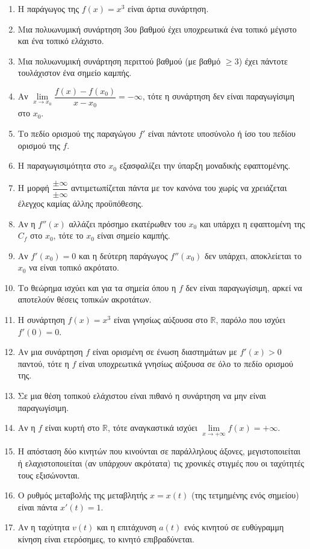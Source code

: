 \begin{enumerate}[label=\textbf{2.\arabic*.}]
    \item Η παράγωγος της $f(x) = x^3$ είναι άρτια συνάρτηση.
    \item Μια πολυωνυμική συνάρτηση 3ου βαθμού έχει υποχρεωτικά ένα τοπικό μέγιστο και ένα τοπικό ελάχιστο.
    \item Μια πολυωνυμική συνάρτηση περιττού βαθμού (με βαθμό $\ge 3$) έχει πάντοτε τουλάχιστον ένα σημείο καμπής.
    \item Αν $\lim\limits_{x \to x_0} \dfrac{f(x)-f(x_0)}{x-x_0} = -\infty$, τότε η συνάρτηση δεν είναι παραγωγίσιμη στο $x_0$.
    \item Το πεδίο ορισμού της παραγώγου $f'$ είναι πάντοτε υποσύνολο ή ίσο του πεδίου ορισμού της $f$.
    \item Η παραγωγισιμότητα στο $x_0$ εξασφαλίζει την ύπαρξη μοναδικής εφαπτομένης.
    \item Η μορφή $\dfrac{\pm\infty}{\pm\infty}$ αντιμετωπίζεται πάντα με τον κανόνα του  χωρίς να χρειάζεται έλεγχος καμίας άλλης προϋπόθεσης.
    \item Αν η $f''(x)$ αλλάζει πρόσημο εκατέρωθεν του $x_0$ και υπάρχει η εφαπτομένη της $C_f$ στο $x_0$, τότε το $x_0$ είναι σημείο καμπής.
    \item Αν $f'(x_0) = 0$ και η δεύτερη παράγωγος $f''(x_0)$ δεν υπάρχει, αποκλείεται το $x_0$ να είναι τοπικό ακρότατο.
    \item Το θεώρημα  ισχύει και για τα σημεία όπου η $f$ δεν είναι παραγωγίσιμη, αρκεί να αποτελούν θέσεις τοπικών ακροτάτων.
    \item Η συνάρτηση $f(x) = x^3$ είναι γνησίως αύξουσα στο $\mathbb{R}$, παρόλο που ισχύει $f'(0) = 0$.
    \item Αν μια συνάρτηση $f$ είναι ορισμένη σε ένωση διαστημάτων με $f'(x)>0$ παντού, τότε η $f$ είναι υποχρεωτικά γνησίως αύξουσα σε όλο το πεδίο ορισμού της.
    \item Σε μια θέση τοπικού ελάχιστου είναι πιθανό η συνάρτηση να μην είναι παραγωγίσιμη.
    \item Αν η $f$ είναι κυρτή στο $\mathbb{R}$, τότε αναγκαστικά ισχύει $\lim\limits_{x \to +\infty} f(x) = +\infty$.
    \item Η απόσταση δύο κινητών που κινούνται σε παράλληλους άξονες, μεγιστοποιείται ή ελαχιστοποιείται (αν υπάρχουν ακρότατα) τις χρονικές στιγμές που οι ταχύτητές τους εξισώνονται.
    \item Ο ρυθμός μεταβολής της μεταβλητής $x=x(t)$ (της τετμημένης ενός σημείου) είναι πάντα $x'(t) = 1$.
    \item Αν η ταχύτητα $v(t)$ και η επιτάχυνση $a(t)$ ενός κινητού σε ευθύγραμμη κίνηση είναι ετερόσημες, το κινητό επιβραδύνεται.

\end{enumerate}
